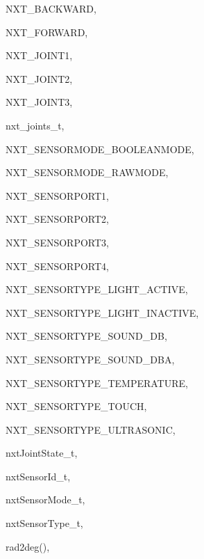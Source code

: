 \begin{theindex}
  \item NXT\_BACKWARD, 
  \item NXT\_FORWARD, 
  \item NXT\_JOINT1, 
  \item NXT\_JOINT2, 
  \item NXT\_JOINT3, 
  \item nxt\_joints\_t, 
  \item NXT\_SENSORMODE\_BOOLEANMODE, 
  \item NXT\_SENSORMODE\_RAWMODE, 
  \item NXT\_SENSORPORT1, 
  \item NXT\_SENSORPORT2, 
  \item NXT\_SENSORPORT3, 
  \item NXT\_SENSORPORT4, 
  \item NXT\_SENSORTYPE\_LIGHT\_ACTIVE, 
  \item NXT\_SENSORTYPE\_LIGHT\_INACTIVE, 
  \item NXT\_SENSORTYPE\_SOUND\_DB, 
  \item NXT\_SENSORTYPE\_SOUND\_DBA, 
  \item NXT\_SENSORTYPE\_TEMPERATURE, 
  \item NXT\_SENSORTYPE\_TOUCH, 
  \item NXT\_SENSORTYPE\_ULTRASONIC, 
  \item nxtJointState\_t, 
  \item nxtSensorId\_t, 
  \item nxtSensorMode\_t, 
  \item nxtSensorType\_t, 

  \indexspace

  \item rad2deg(), 

\end{theindex}
